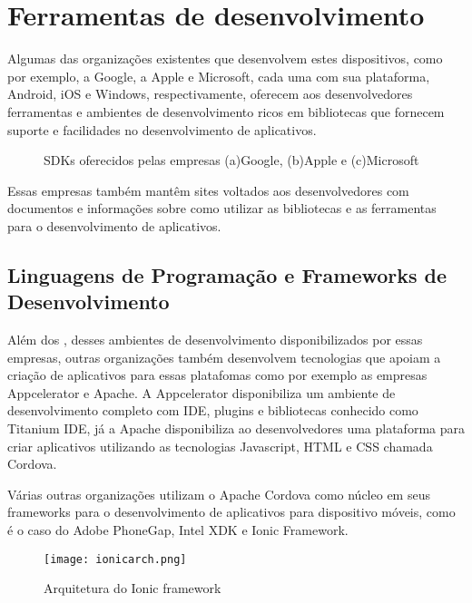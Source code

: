 \chapter{Ferramentas de desenvolvimento}
Algumas das organizações existentes que desenvolvem estes dispositivos, como por exemplo, a Google, a Apple e Microsoft, cada uma com sua plataforma, Android, iOS e Windows, respectivamente, oferecem aos desenvolvedores ferramentas e ambientes de desenvolvimento ricos em bibliotecas que fornecem suporte e facilidades no desenvolvimento de aplicativos.

\begin{figure}[h]
	\center
	\qquad
	\qquad
	\caption{SDKs oferecidos pelas empresas (a)Google, (b)Apple e (c)Microsoft}
\end{figure}

Essas empresas também mantêm sites voltados aos desenvolvedores com documentos e informações sobre como utilizar as bibliotecas e as ferramentas para o desenvolvimento de aplicativos.

\section{Linguagens de Programação e Frameworks de Desenvolvimento}
Além dos , desses ambientes de desenvolvimento disponibilizados por essas empresas, outras organizações também desenvolvem tecnologias que apoiam a criação de aplicativos para essas platafomas como por exemplo as empresas Appcelerator e Apache. A Appcelerator disponibiliza um ambiente de desenvolvimento completo com IDE, plugins e bibliotecas conhecido como Titanium IDE, já a Apache disponibiliza ao desenvolvedores uma plataforma para criar aplicativos utilizando as tecnologias Javascript, HTML e CSS chamada Cordova.

Várias outras organizações utilizam o Apache Cordova como núcleo em seus frameworks para o desenvolvimento de aplicativos para dispositivo móveis, como é o caso do Adobe PhoneGap, Intel XDK e Ionic Framework.

\begin{figure}[!htb]
	\centering
	\texttt{[image: ionicarch.png]} %
	\caption[Arquitetura do Ionic framework]{Arquitetura do Ionic framework}
	\label{fig:ionicarch}
\end{figure}

